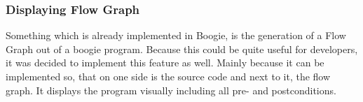 \subsubsection{Displaying Flow Graph}
Something which is already implemented in Boogie, is the generation of a Flow Graph out of a boogie program. Because this could be quite useful for developers, it was decided to implement this feature as well. Mainly because it can be implemented so, that on one side is the source code and next to it, the flow graph. It displays the program visually including all pre- and postconditions. 